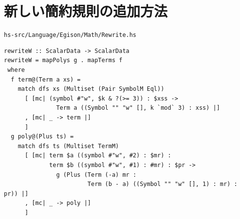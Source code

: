 \chapter{新しい簡約規則の追加方法}\label{rewrite}

\texttt{hs-src/Language/Egison/Math/Rewrite.hs}

\begin{lstlisting}[language=egison,numbers=none]
rewriteW :: ScalarData -> ScalarData
rewriteW = mapPolys g . mapTerms f
 where
  f term@(Term a xs) =
    match dfs xs (Multiset (Pair SymbolM Eql))
      [ [mc| (symbol #"w", $k & ?(>= 3)) : $xss ->
               Term a ((Symbol "" "w" [], k `mod` 3) : xss) |]
      , [mc| _ -> term |]
      ]
  g poly@(Plus ts) =
    match dfs ts (Multiset TermM)
      [ [mc| term $a ((symbol #"w", #2) : $mr) :
             term $b ((symbol #"w", #1) : #mr) : $pr ->
               g (Plus (Term (-a) mr :
                        Term (b - a) ((Symbol "" "w" [], 1) : mr) : pr)) |]
      , [mc| _ -> poly |]
      ]
\end{lstlisting}
